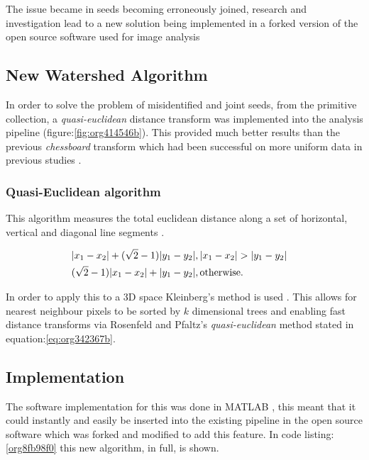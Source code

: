 \documentclass[11pt]{report}
\begin{document}
The issue became in seeds becoming erroneously joined, research and investigation lead to a new solution being implemented in a forked version of the open source software used for image analysis \cite{Hughes2017}

\subsection{New Watershed Algorithm}
\label{sec:orgb6c27b7}

In order to solve the problem of misidentified and joint seeds, from the primitive collection,
a  \emph{quasi-euclidean} distance transform was implemented into the analysis pipeline (figure:\ref{fig:org414546b}). This provided much better results than the previous
\emph{chessboard} transform which had been successful on more uniform data in previous studies \cite{Hughes2017}.

\subsubsection{Quasi-Euclidean algorithm}
\label{sec:org69ca8ec}

This algorithm measures the total euclidean distance along a set of horizontal, vertical and diagonal
line segments \cite{Pfaltz1966}.

\begin{align}
\label{eq:org342367b}
  &\begin{aligned}
&|x_1-x_2|+(\sqrt{2}-1)|y_1-y_2|, |x_1-x_2| > |y_1-y_2| \\
      &(\sqrt{2}-1)|x_1-x_2| + |y_1-y_2|, \textup{otherwise.}
  \end{aligned}
\end{align}

In order to apply this to a 3D space Kleinberg's method is used  \cite{Kleinberg1997}. This allows for nearest neighbour pixels to be sorted by \(k\) dimensional trees
and enabling fast distance transforms via Rosenfeld and Pfaltz's \emph{quasi-euclidean} method stated in equation:\ref{eq:org342367b}.

\subsection{Implementation}
\label{sec:org3979bf7}

The software implementation for this was done in MATLAB \cite{MATHWORKS2017}, this meant that it could instantly and easily be inserted into the existing pipeline in the open source software which was forked and modified to add this feature. In code listing:\ref{org8fb98f0} this new algorithm, in full, is shown.
\end{document}

